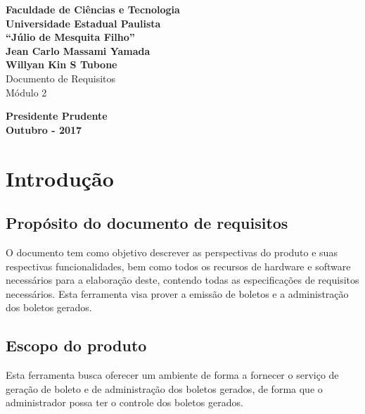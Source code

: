 \documentclass[12pt,a4paper,onecolumn,titlepage]{article}
\begin{document}

\begin{titlepage} %
	
	\vfill
	\begin{center}
	
		{\large \textbf{Faculdade de Ciências e Tecnologia\\Universidade Estadual Paulista\\``Júlio de Mesquita Filho''}} \\[3cm]
		{\large \textbf{Jean Carlo Massami Yamada\\Willyan Kin S Tubone}}\\[4cm]
		{\Large Documento de Requisitos}\\
		{\Large Módulo 2}\\[4cm]


	\vfill
	\vspace{1.5cm}
	
	\large \textbf{Presidente Prudente\\}
	\large \textbf{Outubro - 2017}
	
	\end{center}
	
\end{titlepage}
\newpage

\renewcommand{\contentsname}{Índice}
\tableofcontents
\newpage
\section{Introdução}
\label{sect:intro}

\subsection{Propósito do documento de requisitos}

O documento tem como objetivo descrever as perspectivas do produto e suas
respectivas funcionalidades, bem como todos os recursos de hardware e software necessários para a elaboração deste, contendo todas as especificações de
requisitos necessários. Esta ferramenta visa prover a emissão de boletos e a administração dos boletos gerados.

\subsection{Escopo do produto}

Esta ferramenta busca oferecer um ambiente de forma a fornecer o serviço de geração de boleto e de administração dos boletos gerados, de forma que o administrador possa ter o controle dos boletos gerados.
\end{document}
